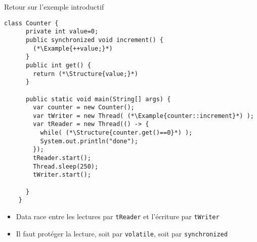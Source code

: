 
\begingroup

\begin{frame}[fragile]{Retour sur l'exemple introductif}

  \begin{lstlisting}[gobble=4]
    class Counter {
      private int value=0;
      public synchronized void increment() {
        (*\Example{++value;}*)
      }
      public int get() {
        return (*\Structure{value;}*)
      }

      public static void main(String[] args) {
        var counter = new Counter();
        var tWriter = new Thread( (*\Example{counter::increment}*) );
        var tReader = new Thread(() -> {
          while( (*\Structure{counter.get()==0}*) );
          System.out.println("done");
        });
        tReader.start();
        Thread.sleep(250);
        tWriter.start();
        
      }
    }
  \end{lstlisting}

  \begin{itemize}
  \item Data race entre les lectures par \lstinline{tReader} et l'écriture par \lstinline{tWriter}
  \item Il faut protéger la lecture, soit par \lstinline{volatile}, soit par \lstinline{synchronized}
  \end{itemize}
  
\end{frame}

\endgroup
\endinput
